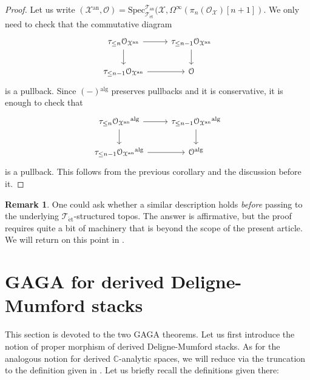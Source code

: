 \documentclass[12pt,a4paper,reqno]{amsart}
\theoremstyle{plain}
\theoremstyle{definition}
\newtheorem{rem}[thm]{Remark}
\theoremstyle{remark}
\numberwithin{equation}{section}
\begin{document}
\begin{proof}
	Let us write $({\mathcal X}{^\mathrm{an}}, {\mathcal O}) = {\mathrm{Spec}^{{\mathcal T}_{\mathrm{an}}}_{{\mathcal T}_{\mathrm{\acute{e}t}}}}({\mathcal X}, \Omega^\infty(\pi_n({\mathcal O}_{\mathcal X})[n+1])$.
	We only need to check that the commutative diagram
	\[ \begin{tikzcd}
		\tau_{\le n} {\mathcal O}_{{\mathcal X}{^\mathrm{an}}} \arrow{r} \arrow{d} & \tau_{\le n - 1} {\mathcal O}_{{\mathcal X}{^\mathrm{an}}} \arrow{d} \\
		\tau_{\le n - 1} {\mathcal O}_{{\mathcal X}{^\mathrm{an}}} \arrow{r} & {\mathcal O}
	\end{tikzcd} \]
	is a pullback.
	Since $(-){^\mathrm{alg}}$ preserves pullbacks and it is conservative, it is enough to check that
	\[ \begin{tikzcd}
		\tau_{\le n} {\mathcal O}_{{\mathcal X}{^\mathrm{an}}}{^\mathrm{alg}} \arrow{r} \arrow{d} & \tau_{\le n - 1} {\mathcal O}_{{\mathcal X}{^\mathrm{an}}}{^\mathrm{alg}} \arrow{d} \\
		\tau_{\le n - 1} {\mathcal O}_{{\mathcal X}{^\mathrm{an}}}{^\mathrm{alg}} \arrow{r} & {\mathcal O}{^\mathrm{alg}}
	\end{tikzcd} \]
	is a pullback.
	This follows from the previous corollary and the discussion before it.
\end{proof}

\begin{rem}
	One could ask whether a similar description holds \emph{before} passing to the underlying ${{\mathcal T}_{\mathrm{\acute{e}t}}}$-structured topos.
	The answer is affirmative, but the proof requires quite a bit of machinery that is beyond the scope of the present article.
	We will return on this point in \cite{Porta_Analytic_deformation_2015}.
\end{rem}

\section{GAGA for derived {Deligne-Mumford\xspace} stacks} \label{sec:derived_GAGA}

This section is devoted to the two GAGA theorems.
Let us first introduce the notion of proper morphism of derived {Deligne-Mumford\xspace} stacks.
As for the analogous notion for derived {$\mathbb C$-analytic\xspace} spaces, we will reduce via the truncation to the definition given in \cite{Porta_Yu_Higher_analytic_stacks_2014}.
Let us briefly recall the definitions given there:
\end{document}
